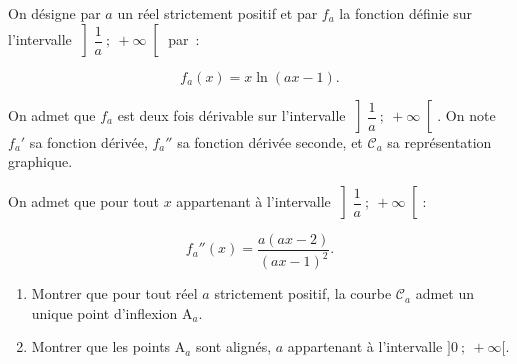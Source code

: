 On désigne par $a$ un réel strictement positif et par $f_a$ la fonction définie sur l'intervalle $\left]\dfrac{1}{a}~;~+\infty\right[$ par~:

\[f_a(x) = x\ln(ax - 1).\]

On admet que $f_a$ est deux fois dérivable sur l'intervalle $\left]\dfrac{1}{a}~;~+\infty\right[$. On note $f_a'$ sa fonction dérivée, $f_a''$ sa fonction dérivée seconde, et $\mathcal{C}_a$ sa représentation graphique.

On admet que pour tout $x$ appartenant à l'intervalle $\left]\dfrac{1}{a}~;~+\infty\right[$:

\[f_a''(x) = \dfrac{a(ax-2)}{(ax-1)^2}.\]

\begin{enumerate}
\item Montrer que pour tout réel $a$ strictement positif, la courbe $\mathcal{C}_a$ admet un unique point d'inflexion A$_a$.
\item Montrer que les points A$_a$ sont alignés, $a$ appartenant à l'intervalle $]0~;~+\infty[$.
\end{enumerate}
